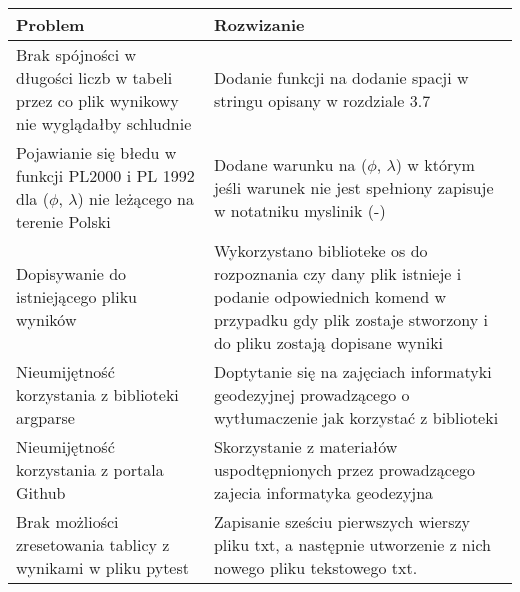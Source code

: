 \begin{table}[h!]
	\centering
	\begin{tabular}{|p{7cm}|p{7cm}|}
		\hline
		 Problem  &  Rozwizanie \\
		\hline
		Brak spójności w długości liczb w tabeli przez co plik wynikowy nie wyglądałby schludnie & Dodanie funkcji na dodanie spacji w stringu opisany w rozdziale 3.7  \\ \hline
		Pojawianie się błedu w funkcji PL2000 i PL 1992 dla ($\phi$, $\lambda$) nie leżącego na terenie Polski & Dodane warunku na ($\phi$, $\lambda$) w którym jeśli warunek nie jest spełniony zapisuje w notatniku myslinik (-)\\ \hline
		Dopisywanie do istniejącego pliku wyników & Wykorzystano biblioteke os do rozpoznania czy dany plik istnieje i podanie odpowiednich komend w przypadku gdy plik zostaje stworzony i do pliku zostają dopisane wyniki\\ \hline
		Nieumijętność korzystania z biblioteki argparse & Doptytanie się na zajęciach informatyki geodezyjnej prowadzącego o wytłumaczenie jak korzystać z biblioteki \\ \hline
		Nieumijętność korzystania z portala Github & Skorzystanie z materiałów uspodtępnionych przez prowadzącego zajecia informatyka geodezyjna\\ \hline
		Brak możliości zresetowania tablicy z wynikami w pliku pytest & Zapisanie sześciu pierwszych wierszy pliku txt, a następnie utworzenie z nich nowego pliku tekstowego txt. \\ \hline
		
	\end{tabular}
\end{table}